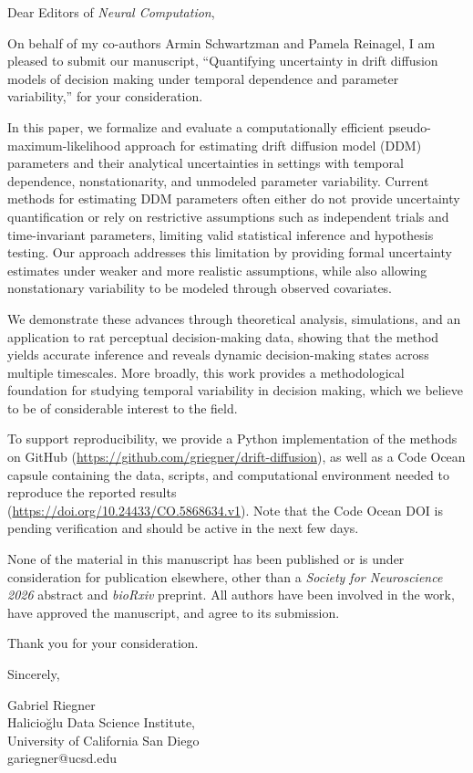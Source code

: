 \documentclass[00-main.tex]{subfiles}
\begin{document}
Dear Editors of \emph{Neural Computation},
\vspace{5mm}

On behalf of my co-authors Armin Schwartzman and Pamela Reinagel, I am pleased to submit our manuscript, ``Quantifying uncertainty in drift diffusion models of decision making under temporal dependence and parameter variability,'' for your consideration.

In this paper, we formalize and evaluate a computationally efficient pseudo-maximum-likelihood approach for estimating drift diffusion model (DDM) parameters and their analytical uncertainties in settings with temporal dependence, nonstationarity, and unmodeled parameter variability. Current methods for estimating DDM parameters often either do not provide uncertainty quantification or rely on restrictive assumptions such as independent trials and time-invariant parameters, limiting valid statistical inference and hypothesis testing. Our approach addresses this limitation by providing formal uncertainty estimates under weaker and more realistic assumptions, while also allowing nonstationary variability to be modeled through observed covariates.

We demonstrate these advances through theoretical analysis, simulations, and an application to rat perceptual decision-making data, showing that the method yields accurate inference and reveals dynamic decision-making states across multiple timescales. More broadly, this work provides a methodological foundation for studying temporal variability in decision making, which we believe to be of considerable interest to the field.

To support reproducibility, we provide a Python implementation of the methods on GitHub (\href{https://github.com/griegner/drift-diffusion}{https://github.com/griegner/drift-diffusion}), as well as a Code Ocean capsule containing the data, scripts, and computational environment needed to reproduce the reported results\\ (\href{https://doi.org/10.24433/CO.5868634.v1}{https://doi.org/10.24433/CO.5868634.v1}). Note that the Code Ocean DOI is pending verification and should be active in the next few days.

None of the material in this manuscript has been published or is under consideration for publication elsewhere, other than a \emph{Society for Neuroscience 2026} abstract and \emph{bioRxiv} preprint. All authors have been involved in the work, have approved the manuscript, and agree to its submission.

Thank you for your consideration.

Sincerely,
\vspace{1cm}

Gabriel Riegner\\
Halicio\u{g}lu Data Science Institute,\\
University of California San Diego\\
gariegner@ucsd.edu
\end{document}
